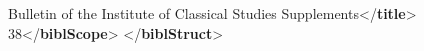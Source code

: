 \begin{shaded}
\mbox{}\newline 
\hspace*{1em}Bulletin of the Institute of Classical Studies\mbox{}\newline 
\hspace*{1em}\hspace*{1em}\hspace*{1em}\hspace*{1em} Supplements{</\textbf{title}>}\mbox{}\newline 
\hspace*{1em}38{</\textbf{biblScope}>}\mbox{}\newline 
{}\mbox{}\newline 
{</\textbf{biblStruct}>}\end{shaded}\egroup\par \par
